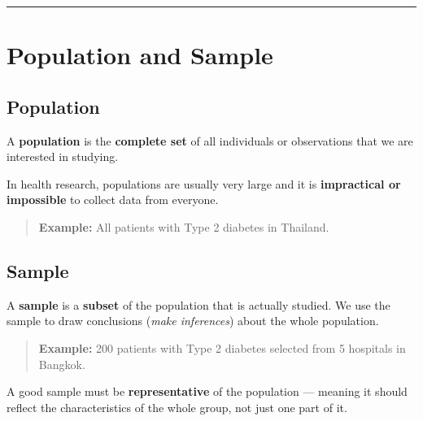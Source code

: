 \documentclass[
  12pt,
  letterpaper,
]{book}
\begin{document}
\begin{center}\rule{0.5\linewidth}{0.5pt}\end{center}


\chapter{Population and Sample}\label{population-and-sample}

\section{Population}\label{population}

A \textbf{population} is the \textbf{complete set} of all individuals or
observations that we are interested in studying.

In health research, populations are usually very large and it is
\textbf{impractical or impossible} to collect data from everyone.

\begin{quote}
\textbf{Example:} All patients with Type 2 diabetes in Thailand.
\end{quote}

\section{Sample}\label{sample}

A \textbf{sample} is a \textbf{subset} of the population that is
actually studied. We use the sample to draw conclusions (\emph{make
inferences}) about the whole population.

\begin{quote}
\textbf{Example:} 200 patients with Type 2 diabetes selected from 5
hospitals in Bangkok.
\end{quote}

\begin{tcolorbox}[enhanced jigsaw, arc=.35mm, bottomrule=.15mm, bottomtitle=1mm, breakable, colback=white, colbacktitle=quarto-callout-important-color!10!white, colframe=quarto-callout-important-color-frame, coltitle=black, left=2mm, leftrule=.75mm, opacityback=0, opacitybacktitle=0.6, rightrule=.15mm, title={⚠️ Key Principle}, titlerule=0mm, toprule=.15mm, toptitle=1mm]

A good sample must be \textbf{representative} of the population ---
meaning it should reflect the characteristics of the whole group, not
just one part of it.

\end{tcolorbox}
\end{document}
